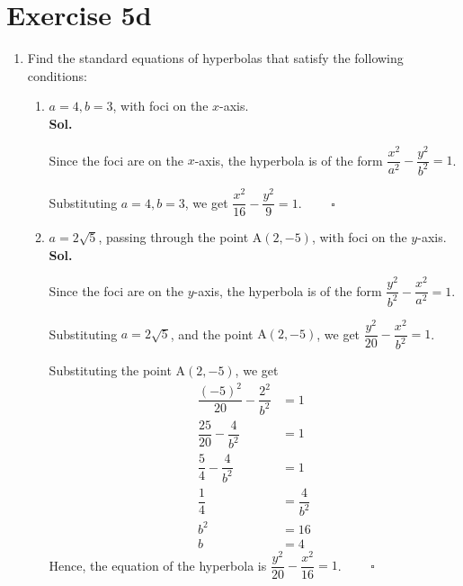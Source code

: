 \documentclass{report}
\newcommand{\sol}{\vspace{1em}\\\textbf{Sol.}}
\newcommand{\eos}{ \qquad \square}
\begin{document}
\section*{Exercise 5d}

\onehalfspacing
\begin{enumerate}[leftmargin=*]
    \item Find the standard equations of hyperbolas that satisfy the following
          conditions:
          \begin{enumerate}
              \item $a=4, b=3$, with foci on the $x$-axis.
                    \sol{}

                    Since the foci are on the $x$-axis, the hyperbola is of the form
                    $\dfrac{x^2}{a^2}-\dfrac{y^2}{b^2}=1$.

                    Substituting $a=4, b=3$, we get $\dfrac{x^2}{16}-\dfrac{y^2}{9}=1$. $\eos$

              \item $a=2 \sqrt{5}$, passing through the point $\mathrm{A}(2,-5)$, with foci on the $y$-axis.
                    \sol{}

                    Since the foci are on the $y$-axis, the hyperbola is of the form
                    $\dfrac{y^2}{b^2}-\dfrac{x^2}{a^2}=1$.

                    Substituting $a=2 \sqrt{5}$, and the point $\mathrm{A}(2,-5)$, we get
                    $\dfrac{y^2}{20}-\dfrac{x^2}{b^2}=1$.

                    Substituting the point $\mathrm{A}(2,-5)$, we get
                    \begin{align*}
                        \dfrac{(-5)^2}{20}-\dfrac{2^2}{b^2} & =1              \\
                        \dfrac{25}{20}-\dfrac{4}{b^2}       & =1              \\
                        \dfrac{5}{4}-\dfrac{4}{b^2}         & =1              \\
                        \dfrac{1}{4}                        & =\dfrac{4}{b^2} \\
                        b^2                                 & =16             \\
                        b                                   & =4
                    \end{align*}
                    Hence, the equation of the hyperbola is $\dfrac{y^2}{20}-\dfrac{x^2}{16}=1$. $\eos$


\end{enumerate}
\end{enumerate}
\end{document}
